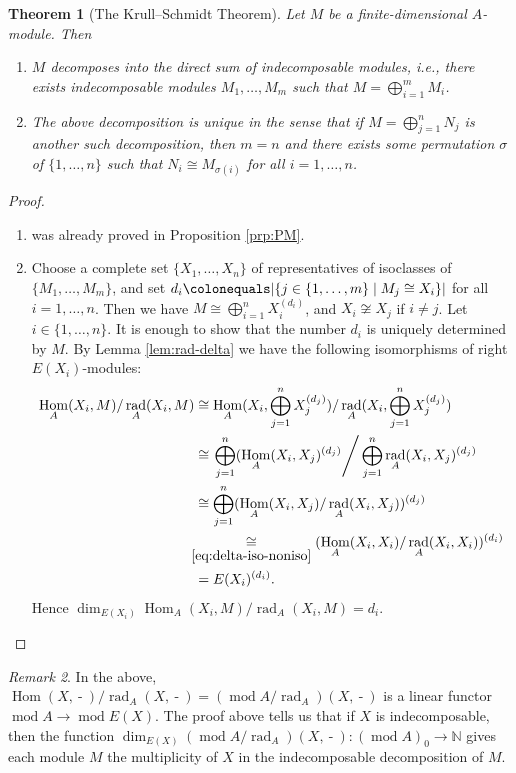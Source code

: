 \documentclass{surv-l}
\numberwithin{equation}{chapter}
\numberwithin{figure}{chapter}
\theoremstyle{plain}
\newtheorem{thm}{Theorem}[section]
\theoremstyle{definition}
\theoremstyle{remark}
\newtheorem{rmk}[thm]{Remark}
\DeclareMathOperator{\Hom}{Hom}
\DeclareMathOperator{\rad}{rad}
\DeclareMathOperator{\blank}{-}
\begin{document}
\begin{thm}[The Krull--Schmidt Theorem]
Let $M$ be a finite-dimensional $A$-module.
Then
\begin{enumerate}
\item
$M$ decomposes into the direct sum of indecomposable modules, i.e.,
there exists indecomposable modules $M_1, \dots, M_m$ such that
$M = \bigoplus_{i=1}^m M_i$.
\item
The above decomposition is unique in the sense that
if $M = \bigoplus_{j=1}^n N_j$ is another such decomposition, then $m = n$ and
there exists some permutation $\sigma$ of $\{1,\dots, n\}$ such that
$N_i \cong M_{\sigma(i)}$ for all $i =1, \dots, n$.
\end{enumerate}
\end{thm}

\begin{proof}\leavevmode
\begin{enumerate}[wide]
\item was already proved in Proposition \ref{prp:PM}.
\item Choose a complete set $\{X_1, \dots, X_n\}$ of representatives of isoclasses of $\{M_1, \dots, M_m\}$,
and set $d_i\colonequals  |\{j \in \{1,\dots,m\} \mid M_j \cong X_i\}|$ for all $i = 1, \dots, n$.
Then we have $M \cong \bigoplus_{i=1}^n X_i^{(d_i)}$, and $X_i \not\cong X_j$ if $i \ne j$.
Let $i \in \{1,\dots, n\}$.
It is enough to show that the number $d_i$ is uniquely determined by $M$.
By Lemma \ref{lem:rad-delta} we have the following isomorphisms of right $E(X_i)$-modules:
\[
\begin{aligned}
\Hom_A(X_i, M)/\rad_A(X_i, M)
&\cong
\Hom_A(X_i, \bigoplus_{j=1}^n X_j^{(d_j)})/\rad_A(X_i,\bigoplus_{j=1}^n X_j^{(d_j)}) \\
&\cong
\left.\bigoplus_{j=1}^n (\Hom_A(X_i, X_j)^{(d_j)}\right/\bigoplus_{j=1}^n \rad_A(X_i, X_j)^{(d_j)}\\
&\cong
\bigoplus_{j=1}^n (\Hom_A(X_i, X_j)/\rad_A(X_i, X_j))^{(d_j)}\\
&\hspace{-5pt}\underset{\eqref{eq:delta-iso-noniso} }{\cong}
(\Hom_A(X_i, X_i)/\rad_A(X_i, X_i))^{(d_i)}\\
&= E(X_i)^{(d_i)}.
\end{aligned}
\]
Hence $\dim_{E(X_i)}\Hom_A(X_i, M)/\rad_A(X_i, M) = d_i$.
\end{enumerate}
\end{proof}

\begin{rmk}
In the above, $\Hom(X, \blank)/\rad_A(X, \blank) = (\operatorname{mod} A/\rad_A)(X, \blank)$
is a linear functor $\operatorname{mod} A \to \operatorname{mod} E(X)$.
The proof above tells us that if $X$ is indecomposable, then
the function $\dim_{E(X)}(\operatorname{mod} A/\rad_A)(X, \blank) \colon (\operatorname{mod} A)_0 \to \mathbb{N}$ gives
each module $M$ the multiplicity of $X$ in the indecomposable decomposition of $M$.
\end{rmk}
\end{document}
